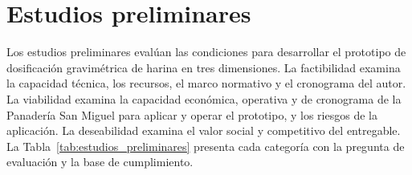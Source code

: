 
\chapter{Estudios preliminares}
\label{cap:estudios_preliminares}


Los estudios preliminares evalúan las condiciones para desarrollar el
prototipo de dosificación gravimétrica de harina en tres dimensiones. La
factibilidad examina la capacidad técnica, los recursos, el marco normativo y
el cronograma del autor. La viabilidad examina la capacidad económica,
operativa y de cronograma de la Panadería San Miguel para aplicar y operar el
prototipo, y los riesgos de la aplicación. La deseabilidad examina el valor
social y competitivo del entregable. La
Tabla~\ref{tab:estudios_preliminares} presenta cada categoría con la pregunta
de evaluación y la base de cumplimiento.

